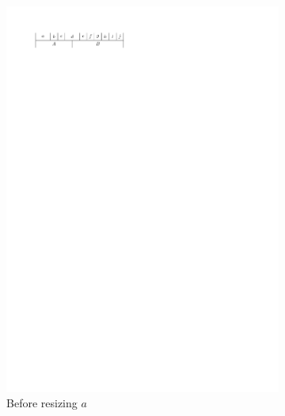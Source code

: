   \begin{figure}[t]
    \quad
    \begin{subfigure}[b]{0.45 \textwidth}
      \centering
      \includegraphics[width=\textwidth]{introduction/img/2sidedBefore.pdf}
      \caption{Before resizing $a$}
      \label{fig:intro:2sidedBefore}
    \end{subfigure}
    \hfill
    \begin{subfigure}[b]{0.45 \textwidth}
      \centering

\end{subfigure}
\end{figure}
